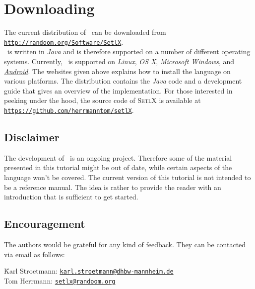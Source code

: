 \section{Downloading}
The current distribution of  \setlx\ can be downloaded from 
\\[0.2cm]
\hspace*{1.3cm}
\href{http://randoom.org/Software/SetlX}{\texttt{http://randoom.org/Software/SetlX}}.
\\[0.2cm]
\setlx\ is
written in \textsl{Java} and is therefore supported on a number of different operating
systems.  Currently, \setlx\ is supported on \textsl{Linux}, \textsl{OS X},
\textsl{Microsoft Windows}, and
\href{https://play.google.com/store/apps/details?id=org.randoom.setlxUI.android}{\textsl{Android}}.   
The websites given above explains how to install the language on various platforms.  
The distribution contains the \textsl{Java} code and a development guide that gives an
overview of the implementation. For those
interested in peeking under the hood, the source code of \textsc{SetlX}
is available at
\\[0.2cm]
\hspace*{1.3cm}
\href{https://github.com/herrmanntom/setlX}{\texttt{https://github.com/herrmanntom/setlX}}.



\subsection*{Disclaimer}
The development of \setlx\ is an ongoing project.  Therefore some of the material presented in
this tutorial might be out of date, while certain aspects of the language won't be
covered.  The current version of this tutorial is not intended to be a reference manual.
The idea is rather to provide the reader with an introduction that is sufficient to get started.

\subsection*{Encouragement}
The authors would be grateful for any kind of feedback.  They can be contacted via
email as follows:
\begin{tabbing}
\qquad \= Karl Stroetmann: \qquad \= \href{mailto:karl.stroetmann@dhbw-mannheim.de}{\texttt{karl.stroetmann@dhbw-mannheim.de}} \\[0.2cm]
       \> Tom Herrmann:           \> \href{mailto:setlx@randoom.org}{\texttt{setlx@randoom.org}}
\end{tabbing}


